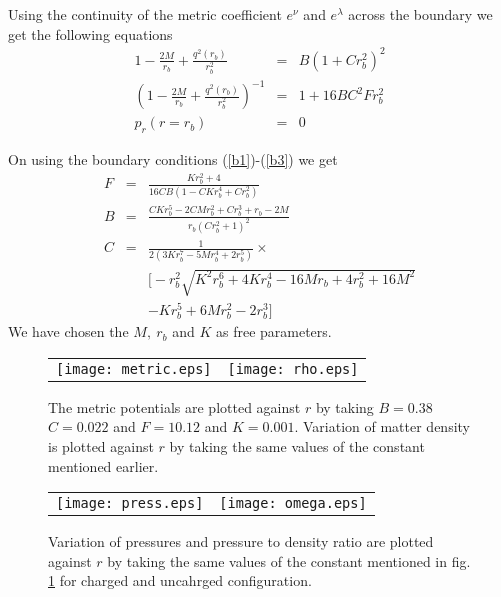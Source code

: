 \documentclass[preprintnumbers,amsmath,amssymb,floatfix,9pt,prd,twocolumn,
superscriptaddress,nofootinbib]{revtex4}
\begin{document}
Using the continuity of the metric coefficient $e^{\nu}$ and $e^{\lambda}$ across the boundary we get the following equations
\begin{eqnarray}
1-\frac{2M}{r_b}+\frac{q^2(r_b)}{r_b^{2}} &=& B(1+C r_b^{2})^{2} \label{b1}\\
\left(1-\frac{2M}{r_b}+\frac{q^2(r_b)}{r_b^{2}}\right)^{-1} &=& 1 + 16 B C^2 F r_b^2   \label{b2}\\
p_r(r=r_b) &=& 0 \label{b3}
\end{eqnarray}

On using the boundary conditions (\ref{b1})-(\ref{b3}) we get
\begin{eqnarray}
F &=& \frac{K r_b^2+4}{16 C B (1-C K r_b^4+C r_b^2)} \\
B &=& \frac{C K r_b^5-2 C M r_b^2+C r_b^3+r_b-2 M}{r_b (C r_b^2+1)^2}\\
C &=& \frac{1}{2 (3 K r_b^7-5 M r_b^4+2 r_b^5)}\times \nonumber\\&&\Big[-r_b^2 \sqrt{K^2 r_b^6+4 K r_b^4-16 M r_b+4 r_b^2+16 M^2} \nonumber\\&&-K r_b^5+6 M r_b^2-2 r_b^3\Big]
\end{eqnarray}
We have chosen the $M,~r_b$ and $K$ as free parameters.

\begin{figure*}[thbp]
\begin{center}
\begin{tabular}{rl}
\texttt{[image: metric.eps]}&
\texttt{[image: rho.eps]}\\
\end{tabular}
\end{center}
\caption{The metric potentials are plotted against $r$ by taking $B=0.38$ $C=0.022$ and $F=10.12$ and $K=0.001$. Variation of matter density is plotted against $r$ by taking the same values of the constant mentioned earlier.}\label{md}
\end{figure*}


\begin{figure*}[thbp]
\begin{center}
\begin{tabular}{rl}
\texttt{[image: press.eps]}&
\texttt{[image: omega.eps]}\\
\end{tabular}
\end{center}
\caption{Variation of pressures and pressure to density ratio are plotted against $r$ by taking the same values of the constant mentioned in fig. \ref{md} for charged and uncahrged configuration.}\label{prpt}
\end{figure*}
\end{document}
